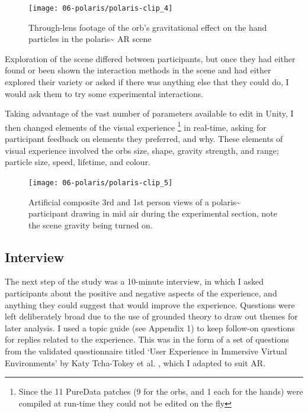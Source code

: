 \begin{figure}[ht]
    \centering
    \texttt{[image: 06-polaris/polaris-clip\_4]}
    \captionsetup{justification=centering,margin=1.5cm}
    \caption{Through-lens footage of the orb’s gravitational effect on the hand particles in the polaris\textasciitilde{} AR scene \citep[from][\href{https://youtu.be/lCBgMs8ULj0?t=495}{at 8:14}]{bilbow2022c}}\label{fig: polaris-clip_4}
\end{figure}

Exploration of the scene differed between participants, but once they had either found or been shown the interaction methods in the scene and had either explored their variety or asked if there was anything else that they could do, I would ask them to try some experimental interactions.

Taking advantage of the vast number of parameters available to edit in Unity, I then changed elements of the visual   experience \footnote{Since the 11 PureData patches (9 for the orbs, and 1 each for the hands) were compiled at run-time they could not be edited on the fly} in real-time, asking for participant feedback on elements they preferred, and why. These elements of visual experience involved the orbs size, shape, gravity strength, and range; particle size, speed, lifetime, and colour.

\begin{figure}[ht]
    \centering
    \texttt{[image: 06-polaris/polaris-clip\_5]}
    \captionsetup{justification=centering,margin=1.5cm}
    \caption{Artificial composite 3rd and 1st person views of a polaris\textasciitilde{} participant drawing in mid air during the experimental section, note the scene gravity being turned on.  \citep[from][\href{https://youtu.be/72JLG1fGboY}{clip URL}]{bilbow2022}}\label{fig: polaris-clip_5}
\end{figure}

\subsection{Interview}\label{sec: polaris-study-interview}
The next step of the study was a 10-minute interview, in which I asked participants about the positive and negative aspects of the experience, and anything they could suggest that would improve the experience. Questions were left deliberately broad due to the use of grounded theory to draw out themes for later analysis. I used a topic guide (see Appendix 1) to keep follow-on questions for replies related to the experience. This was in the form of a set of questions from the validated questionnaire titled `User Experience in Immersive Virtual Environments' by Katy Tcha-Tokey et al. \citeyearpar{tcha-tokey2016a}, which I adapted to suit AR.


